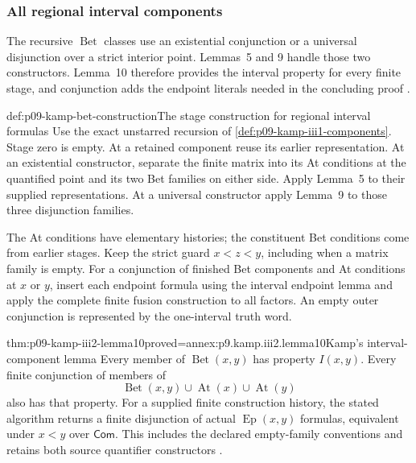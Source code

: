
\subsubsection{All regional interval components}
\label{sec:p09-kamp-iii2-lemma10}

The recursive \(\operatorname{Bet}\) classes use an existential
conjunction or a universal disjunction over a strict interior point.
Lemmas~5 and 9 handle those two constructors. Lemma~10 therefore
provides the interval property for every finite stage, and conjunction
adds the endpoint literals needed in the concluding proof
\cite[ch.~III, lemma~10, p.~93]{Kamp1968}.

\begin{hbmethod}{def:p09-kamp-bet-construction}{The stage construction for regional interval formulas}
Use the exact unstarred recursion of
\cref{def:p09-kamp-iii1-components}. Stage zero is empty.
At a retained component reuse its earlier representation. At an
existential constructor, separate the finite matrix into its At
conditions at the quantified point and its two Bet families on either
side. Apply Lemma~5 to their supplied representations. At a universal
constructor apply Lemma~9 to those three disjunction families.

The At conditions have elementary histories; the constituent Bet
conditions come from earlier stages. Keep the strict guard
\(x<z<y\), including when a matrix family is empty. For a
conjunction of finished Bet components and At conditions at \(x\)
or \(y\), insert each endpoint formula using the interval endpoint
lemma and apply the complete finite fusion construction to all factors.
An empty outer conjunction is represented by the one-interval truth word.
\end{hbmethod}

\begin{hblemma}{thm:p09-kamp-iii2-lemma10}{proved=annex:p9.kamp.iii2.lemma10}{Kamp's interval-component lemma}
Every member of \(\operatorname{Bet}(x,y)\) has property
\(I(x,y)\). Every finite conjunction of members of
\[
       \operatorname{Bet}(x,y)\cup\operatorname{At}(x)
                                      \cup\operatorname{At}(y)
\]
also has that property. For a supplied finite construction history,
the stated algorithm returns a finite disjunction of actual
\(\operatorname{Ep}(x,y)\) formulas, equivalent under \(x<y\)
over \(\mathsf{Com}\). This includes the declared empty-family
conventions and retains both source quantifier constructors
\cite[ch.~III, lemma~10, p.~93]{Kamp1968}.
\end{hblemma}

